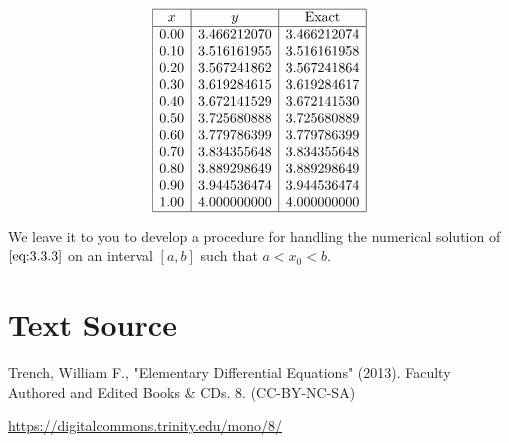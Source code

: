 \documentclass{ximera}
\begin{document}
\begin{example}
\begin{explanation}
$$
\begin{array}{|c|c|c|}
\hline
x&
y&
\text{Exact}\\ \hline
0.00  &   3.466212070 &  3.466212074\\
0.10  &   3.516161955 &  3.516161958\\
0.20  &   3.567241862 &  3.567241864\\
0.30  &   3.619284615 &  3.619284617\\
0.40  &   3.672141529 &  3.672141530\\
0.50  &   3.725680888 &  3.725680889\\
0.60  &   3.779786399 &  3.779786399\\
0.70  &   3.834355648 &  3.834355648\\
0.80  &   3.889298649 &  3.889298649\\
0.90  &   3.944536474 &  3.944536474\\
1.00  &   4.000000000 &  4.000000000\\
\hline
\end{array}
$$

\end{explanation}
\end{example}

We leave it to you to develop a procedure for handling the
numerical solution of $\eqref{eq:3.3.3}$ on an interval $[a,b]$
such that $a<x_0<b$. %


\section*{Text Source}

Trench, William F., "Elementary Differential Equations" (2013). Faculty Authored and Edited Books \& CDs. 8. (CC-BY-NC-SA)

\href{https://digitalcommons.trinity.edu/mono/8/}{https://digitalcommons.trinity.edu/mono/8/} 
\end{document}
